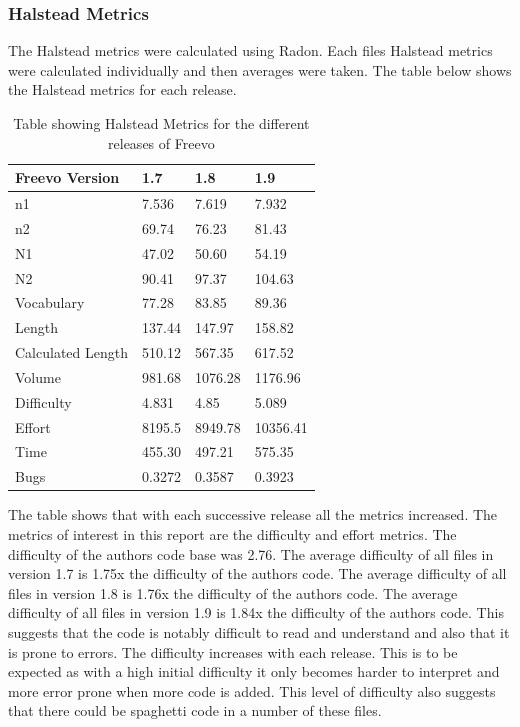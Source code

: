\documentclass[10.5pt,journal, a4paper]{IEEEtran}
\begin{document}
\subsubsection{Halstead Metrics}
\noindent
The Halstead metrics were calculated using Radon. Each files Halstead metrics were calculated individually and then averages were taken. The table below shows the Halstead metrics for each release.

\begin{table}[]
\centering
\caption{Table showing Halstead Metrics for the different releases of Freevo}
\label{my-label}
\begin{tabular}{|l|l|l|l|}
\hline
Freevo Version    & 1.7    & 1.8     & 1.9      \\ \hline
n1                & 7.536  & 7.619   & 7.932    \\ \hline
n2                & 69.74  & 76.23   & 81.43    \\ \hline
N1                & 47.02  & 50.60   & 54.19    \\ \hline
N2                & 90.41  & 97.37   & 104.63   \\ \hline
Vocabulary        & 77.28  & 83.85   & 89.36    \\ \hline
Length            & 137.44 & 147.97  & 158.82   \\ \hline
Calculated Length & 510.12 & 567.35  & 617.52   \\ \hline
Volume            & 981.68 & 1076.28 & 1176.96  \\ \hline
Difficulty        & 4.831  & 4.85    & 5.089    \\ \hline
Effort            & 8195.5 & 8949.78 & 10356.41 \\ \hline
Time              & 455.30 & 497.21  & 575.35   \\ \hline
Bugs              & 0.3272 & 0.3587  & 0.3923   \\ \hline
\end{tabular}
\end{table}

\noindent
The table shows that with each successive release all the metrics increased. The metrics of interest in this report are the difficulty and effort metrics. The difficulty of the authors code base was 2.76. The average difficulty of all files in version 1.7 is 1.75x the difficulty of the authors code. The average difficulty of all files in version 1.8 is 1.76x the difficulty of the authors code. The average difficulty of all files in version 1.9 is 1.84x the difficulty of the authors code. This suggests that the code is notably difficult to read and understand and also that it is prone to errors. The difficulty increases with each release. This is to be expected as with a high initial difficulty it only becomes harder to interpret and more error prone when more code is added. This level of difficulty also suggests that there could be spaghetti code in a number of these files. \\
\end{document}
